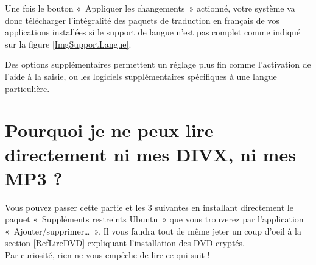 Une fois le bouton «~Appliquer les changements~» actionné, votre système va donc télécharger l'intégralité des paquets de traduction en français de vos applications installées si le support de langue n'est pas complet comme indiqué sur la figure \ref{ImgSupportLangue}.\par
Des options supplémentaires permettent un réglage plus fin comme l'activation de l'aide à la saisie, ou les logiciels supplémentaires spécifiques à une langue particulière.\par
{}
\section{Pourquoi je ne peux lire directement ni mes DIVX, ni mes MP3 ?}
Vous pouvez passer cette partie et les 3 suivantes en installant directement le paquet «~Suppléments restreints Ubuntu~» que vous trouverez par l'application «~Ajouter/supprimer\dots{}~». Il vous faudra tout de même jeter un coup d'oeil à la section \ref{RefLireDVD} expliquant l'installation des DVD cryptés.\\
Par curiosité, rien ne vous empêche de lire ce qui suit !
